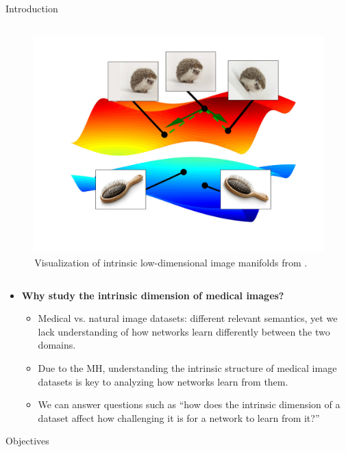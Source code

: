 \documentclass[final,hyperref={pdfpagelabels=false}]{beamer}
\begin{document}
\begin{frame}[t]
\begin{columns}[t]
\begin{column}{.3\textwidth}
\begin{block}{Introduction}
\begin{columns}
\begin{column}{.43\textwidth} %
\centering
\begin{figure}
    \includegraphics[width=0.95\linewidth]{buchanan_etal_fig1.pdf}
     \caption{\,Visualization of intrinsic low-dimensional image manifolds from \cite{buchanan2021deep}.}
\end{figure}
\end{column}
\end{columns} %
\begin{itemize}
\item \textbf{Why study the intrinsic dimension of medical images?}
    \begin{itemize}
        \item Medical vs. natural image datasets: different relevant semantics, yet we lack understanding of how networks learn differently between the two domains.
        \item Due to the MH, understanding the intrinsic structure of medical image datasets is key to analyzing how networks learn from them.
        \item We can answer questions such as ``how does the intrinsic dimension of a dataset affect how challenging it is for a network to learn from it?''
    \end{itemize}
\end{itemize}

\end{block}

\begin{block}{Objectives}


\end{block}
\end{column}
\end{columns}
\end{frame}
\end{document}
